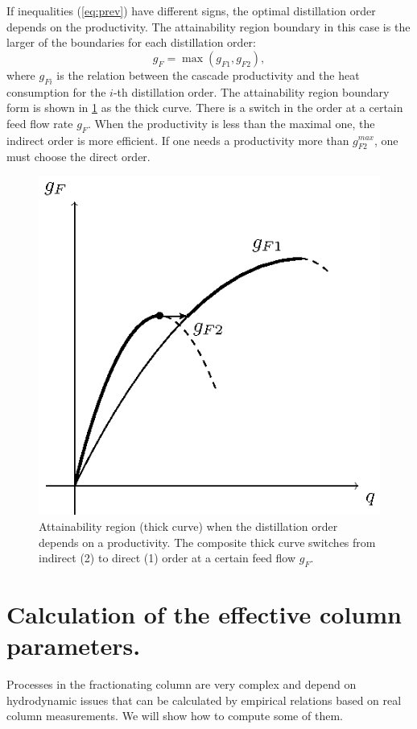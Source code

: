 \documentclass[12pt]{article}
\begin{document}
If inequalities (\ref{eq:prev}) have different signs, the optimal distillation order depends on the productivity. The attainability region boundary in this case is the larger of the boundaries for each distillation order:
\begin{equation}
g_F = \max(g_{F1}, g_{F2}),
\end{equation}
where $g_{Fi}$ is the relation between the cascade productivity and the heat consumption for the $i$-th distillation order. The attainability region boundary form is shown in \ref{fig:pic2} as the thick curve. There is a switch in the order at a certain feed flow rate $g_F$. When the productivity is less than the maximal one, the indirect order is more efficient. If one needs a productivity more than $g_{F2}^{max}$, one must choose the direct order.
\begin{figure}[tbh]
\centering
\includegraphics{pic2}
\caption{Attainability region (thick curve) when the distillation order depends on a productivity. The composite thick curve switches from indirect (2) to direct (1) order at a certain feed flow $g_F$.}
\label{fig:pic2}
\end{figure}


\section {Calculation of the effective column parameters.}
Processes in the fractionating column are very complex and depend on hydrodynamic issues that can be calculated by empirical relations based on real column measurements. We will show how to compute some of them.
\end{document}
